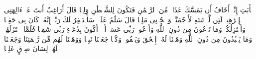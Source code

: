 \stopbuffer%
\startbuffer[\q:19:45]
یَٰۤأَبَتِ إِنِّیۤ أَخَافُ أَن یَمَسَّكَ عَذَابࣱ مِّنَ ٱلرَّحۡمَٰنِ فَتَكُونَ لِلشَّیۡطَٰنِ وَلِیࣰّا%
\stopbuffer%
\startbuffer[\q:19:46]
قَالَ أَرَاغِبٌ أَنتَ عَنۡ ءَالِهَتِی یَٰۤإِبۡرَٰهِیمُۖ لَئِن لَّمۡ تَنتَهِ لَأَرۡجُمَنَّكَۖ وَٱهۡجُرۡنِی مَلِیࣰّا%
\stopbuffer%
\startbuffer[\q:19:47]
قَالَ سَلَٰمٌ عَلَیۡكَۖ سَأَسۡتَغۡفِرُ لَكَ رَبِّیۤۖ إِنَّهُۥ كَانَ بِی حَفِیࣰّا%
\stopbuffer%
\startbuffer[\q:19:48]
وَأَعۡتَزِلُكُمۡ وَمَا تَدۡعُونَ مِن دُونِ ٱللَّهِ وَأَدۡعُوا۟ رَبِّی عَسَىٰۤ أَلَّاۤ أَكُونَ بِدُعَاۤءِ رَبِّی شَقِیࣰّا%
\stopbuffer%
\startbuffer[\q:19:49]
فَلَمَّا ٱعۡتَزَلَهُمۡ وَمَا یَعۡبُدُونَ مِن دُونِ ٱللَّهِ وَهَبۡنَا لَهُۥۤ إِسۡحَٰقَ وَیَعۡقُوبَۖ وَكُلࣰّا جَعَلۡنَا نَبِیࣰّا%
\stopbuffer%
\startbuffer[\q:19:50]
وَوَهَبۡنَا لَهُم مِّن رَّحۡمَتِنَا وَجَعَلۡنَا لَهُمۡ لِسَانَ صِدۡقٍ عَلِیࣰّا%
\stopbuffer%
